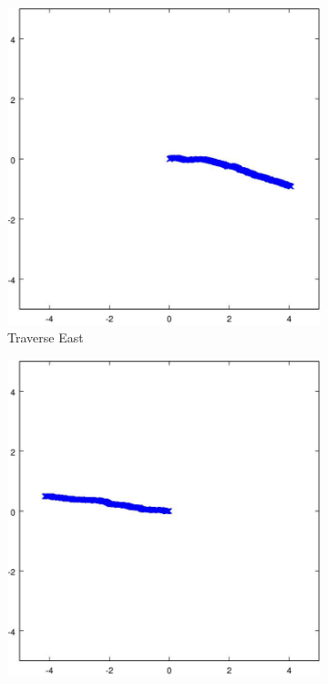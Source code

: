 \documentclass{article}
\begin{document}
\begin{figure}[H]
	\centering
	
	\begin{subfigure}[b]{0.32\linewidth}
		\includegraphics[width=\textwidth]{images/traverse_east_with_noise.jpg}
		\caption{Traverse East}
	\end{subfigure}
	\begin{subfigure}[b]{0.32\linewidth}
		\includegraphics[width=\textwidth]{images/traverse_west_with_noise.jpg}

\end{subfigure}
\end{figure}
\end{document}
